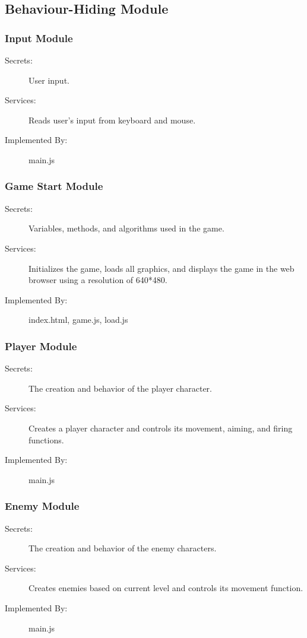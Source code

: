 \documentclass[12pt, titlepage]{article}
\begin{document}
\subsection{Behaviour-Hiding Module}

\subsubsection{Input Module}

\begin{description}
\item[Secrets:]User input.
\item[Services:]Reads user's input from keyboard and mouse.
\item[Implemented By:] main.js
\end{description}

\subsubsection{Game Start Module}

\begin{description}
\item[Secrets:]Variables, methods, and algorithms used in the game.
\item[Services:]Initializes the game, loads all graphics, and displays the game in the web browser using a resolution of 640*480. 
\item[Implemented By:] index.html, game.js, load.js
\end{description}

\subsubsection{Player Module}

\begin{description}
\item[Secrets:]The creation and behavior of the player character.
\item[Services:]Creates a player character and controls its movement, aiming, and firing functions.
\item[Implemented By:] main.js
\end{description}

\subsubsection{Enemy Module}

\begin{description}
\item[Secrets:]The creation and behavior of the enemy characters.
\item[Services:]Creates enemies based on current level and controls its movement function.
\item[Implemented By:] main.js
\end{description}
\end{document}
